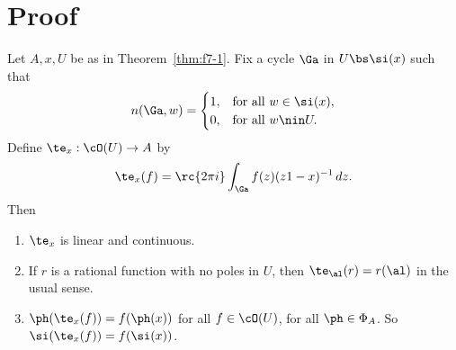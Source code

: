 \section{Proof}
\begin{lem}
Let $A,x,U$ be as in Theorem~\ref{thm:f7-1}. Fix a cycle $\Ga$ in $U\bs \si(x)$ such that 
\[
n(\Ga,w)=\begin{cases}
1,&\text{for all }w\in \si(x),\\
0,&\text{for all }w\nin U.
\end{cases}
\]
Define $\te_x:\cO(U)\to A$ by 
\[\te_x(f)=\rc{2\pi i} \int_{\Ga} f(z)(z1-x)^{-1}\,dz.\]
Then
\begin{enumerate}
\item
$\te_x$ is linear and continuous.
\item
If $r$ is a rational function with no poles in $U$, then $\te_{\al}(r)=r(\al)$ in the usual sense. 
\item
$\ph(\te_x(f))=f(\ph(x))$ for all $f\in \cO(U)$, for all $\ph\in \Phi_A$. So $\si(\te_x(f))=f(\si(x))$. 
\end{enumerate}
\end{lem}
